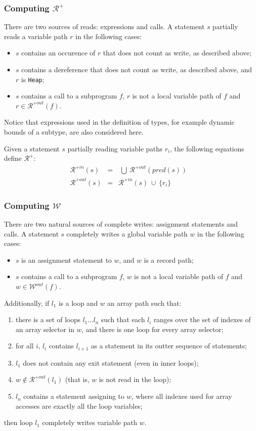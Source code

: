 \documentclass{article}
\newcounter{example}
\newcommand{\code}[1]{\texttt{#1}}
\newcommand{\heap}{\code{Heap}\xspace}
\newcommand{\pred}[1]{\ensuremath{\mathit{pred}(#1)}\xspace}
\newcommand{\writes}{$\mathcal{W}$\xspace}
\newcommand{\outwrites}[1]{\ensuremath{\mathcal{W}^{out}(#1)}\xspace}
\newcommand{\allreads}{$\mathcal{R^+}$\xspace}
\newcommand{\inallreads}[1]{\ensuremath{\mathcal{R}^{+in}(#1)}\xspace}
\newcommand{\outallreads}[1]{\ensuremath{\mathcal{R}^{+out}(#1)}\xspace}
\newcommand{\union}{~\cup~}
\newcommand{\bigunion}{~\bigcup~}
\begin{document}
\subsubsection{Computing \allreads}

There are two sources of reads: expressions and calls. A statement $s$
partially reads a variable path $r$ in the following cases:
\begin{itemize}
\item $s$ contains an occurence of $r$ that does not count as write, as
  described above;
\item $s$ contains a dereference that does not count as write, as described
  above, and $r$ is \heap;
\item $s$ contains a call to a subprogram $f$, $r$ is not a local variable path
  of $f$ and $r \in \outallreads{f}$.
\end{itemize}

Notice that expressions used in the definition of types, for example dynamic
bounds of a subtype, are also considered here.

Given a statement $s$ partially reading variable paths $r_i$, the following
equations define \allreads:
\begin{eqnarray*}
\inallreads{s} &=& \bigunion \outallreads{\pred{s}}\\
\outallreads{s} &=& \inallreads{s} \union \{r_i\}
\end{eqnarray*}

\subsubsection{Computing \writes}

There are two natural sources of complete writes: assignment statements and
calls. A statement $s$ completely writes a global variable path $w$ in the
following cases:
\begin{itemize}
\item $s$ is an assignment statement to $w$, and $w$ is a record path;
\item $s$ contains a call to a subprogram $f$, $w$ is not a local variable path
  of $f$ and $w \in \outwrites{f}$.
\end{itemize}
Additionally, if $l_1$ is a loop and $w$ an array path such that:
\begin{enumerate}
\item there is a set of loops $l_1...l_n$ such that each $l_i$ ranges over the
  set of indexes of an array selector in $w$, and there is one loop for every
  array selector;
\item for all $i$, $l_i$ contains
  $l_{i+1}$ as a statement in its outter sequence of statements;
\item $l_1$ does not contain any exit statement (even in inner loops);
\item $w \notin \outallreads{l_1}$ (that is, $w$ is not read in the loop);
\item $l_n$ contains a statement assigning to $w$, where all indexes used for
  array accesses are exactly all the loop variables;
\end{enumerate}
then loop $l_1$ completely writes variable path $w$.
\end{document}
